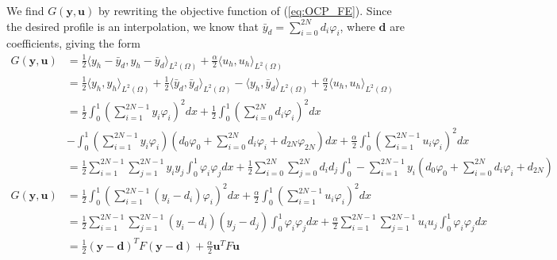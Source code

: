 We find $G(\mathbf{y, u})$ by rewriting the objective function of (\ref{eq:OCP_FE}).
Since the desired profile is an interpolation, we know that $\bar{y}_d = \sum_{i=0}^{2N}d_i\varphi_i$, where $\mathbf{d}$ are coefficients, giving the form
\begin{align*}
    G(\mathbf{y, u}) &= \frac{1}{2}\langle y_h - \bar{y}_d, y_h - \bar{y}_d \rangle_{L^2{(\Omega)}} + \frac{\alpha}{2} \langle u_h, u_h \rangle_{L^2(\Omega)} \\
   &= \frac{1}{2}\langle y_h , y_h \rangle_{L^2{(\Omega)}} +  \frac{1}{2}\langle \bar{y}_d ,\bar{y}_d  \rangle_{L^2{(\Omega)}}
   - \langle y_h, \bar{y}_d \rangle_{L^2{(\Omega)}} + \frac{\alpha}{2} \langle u_h, u_h \rangle_{L^2(\Omega)} \\
     &= \frac{1}{2}\int_0^1\left( \sum_{i=1}^{2N-1}y_i \varphi_i \right)^2dx  + \frac{1}{2}\int_0^1\left( \sum_{i=0}^{2N}d_i \varphi_i \right)^2dx \\
     &- \int_0^1\left( \sum_{i=1}^{2N-1}y_i \varphi_i \right) \left(d_0 \varphi_0 + \sum_{i=0}^{2N} d_i \varphi_i + d_{2N} \varphi_{2N} \right)dx + 
     \frac{\alpha}{2}\int_0^1\left(\sum_{i=1}^{2N-1} u_i \varphi_i  \right)^2dx \\    
     &= \frac{1}{2}\sum_{i=1}^{2N-1}\sum_{j=1}^{2N-1} y_i y_j \int_0^1 \varphi_i \varphi_j dx + \frac{1}{2}\sum_{i=0}^{2N}\sum_{j=0}^{2N} d_i d_j \int_0^1
    - \sum_{i=1}^{2N-1} y_i \left( d_0 \varphi_0 + \sum_{i=0}^{2N} d_i \varphi_i + d_{2N}  \right)  
\end{align*}
\begin{align*}
    G(\mathbf{y, u}) &= \frac{1}{2}\int_0^1\left( \sum_{i=1}^{2N-1}\left( y_i -d_i\right) \varphi_i \right)^2dx + \frac{\alpha}{2}\int_0^1\left(\sum_{i=1}^{2N-1} u_i \varphi_i  \right)^2dx \\    
    &=\frac{1}{2} \sum_{i=1}^{2N-1}\sum_{j=1}^{2N-1}\left( y_i -d_i\right)\left( y_j -d_j\right) \int_0^1  \varphi_i \varphi_j dx + \frac{\alpha}{2}\sum_{i=1}^{2N-1}\sum_{j=1}^{2N-1} u_i u_j\int_0^1
     \varphi_i \varphi_j dx    \\
     &= \frac{1}{2} \left( \mathbf{y} - \mathbf{d} \right)^T F \left( \mathbf{y} - \mathbf{d} \right) + \frac{\alpha}{2}\mathbf{u}^T F \mathbf{u} 
\end{align*}

